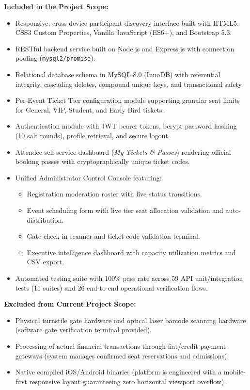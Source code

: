 \documentclass[11pt,a4paper]{article}
\begin{document}
\textbf{Included in the Project Scope:}
\begin{itemize}[leftmargin=*]
    \item Responsive, cross-device participant discovery interface built with HTML5, CSS3 Custom Properties, Vanilla JavaScript (ES6+), and Bootstrap 5.3.
    \item RESTful backend service built on Node.js and Express.js with connection pooling (\texttt{mysql2/promise}).
    \item Relational database schema in MySQL 8.0 (InnoDB) with referential integrity, cascading deletes, compound unique keys, and transactional safety.
    \item Per-Event Ticket Tier configuration module supporting granular seat limits for General, VIP, Student, and Early Bird tickets.
    \item Authentication module with JWT bearer tokens, bcrypt password hashing (10 salt rounds), profile retrieval, and secure logout.
    \item Attendee self-service dashboard (\textit{My Tickets \& Passes}) rendering official booking passes with cryptographically unique ticket codes.
    \item Unified Administrator Control Console featuring:
    \begin{itemize}
        \item Registration moderation roster with live status transitions.
        \item Event scheduling form with live tier seat allocation validation and auto-distribution.
        \item Gate check-in scanner and ticket code validation terminal.
        \item Executive intelligence dashboard with capacity utilization metrics and CSV export.
    \end{itemize}
    \item Automated testing suite with 100\% pass rate across 59 API unit/integration tests (11 suites) and 26 end-to-end operational verification flows.
\end{itemize}

\textbf{Excluded from Current Project Scope:}
\begin{itemize}[leftmargin=*]
    \item Physical turnstile gate hardware and optical laser barcode scanning hardware (software gate verification terminal provided).
    \item Processing of actual financial transactions through fiat/credit payment gateways (system manages confirmed seat reservations and admissions).
    \item Native compiled iOS/Android binaries (platform is engineered with a mobile-first responsive layout guaranteeing zero horizontal viewport overflow).
\end{itemize}
\end{document}
